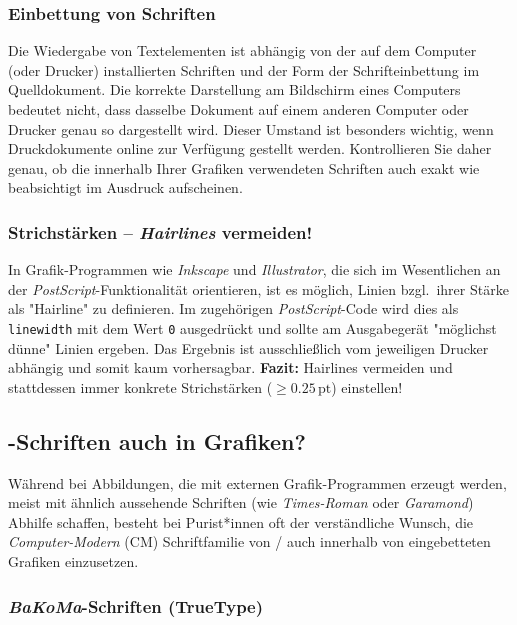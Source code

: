 \subsubsection{Einbettung von Schriften}

Die Wiedergabe von Textelementen ist abhängig von der auf dem Computer (oder
Drucker) installierten Schriften und der Form der Schrifteinbettung im
Quelldokument. Die korrekte Darstellung am Bildschirm eines Computers
bedeutet nicht, dass dasselbe Dokument auf einem anderen Computer oder
Drucker genau so dargestellt wird. Dieser Umstand ist besonders wichtig, wenn
Druckdokumente online zur Verfügung gestellt werden. Kontrollieren Sie daher
genau, ob die innerhalb Ihrer Grafiken verwendeten Schriften auch exakt wie
beabsichtigt im Ausdruck aufscheinen.


\subsubsection{Strichstärken -- \emph{Hairlines} vermeiden!}

In Grafik-Programmen wie \emph{Inkscape} und \emph{Illustrator}, die sich im
Wesentlichen an der \emph{PostScript}-Funktionalität orientieren, ist es
möglich, Linien bzgl.\ ihrer Stärke als "Hairline" zu definieren. Im
zugehörigen \emph{PostScript}-Code wird dies als \texttt{linewidth} mit dem
Wert \texttt{0} ausgedrückt und sollte am Ausgabegerät "möglichst dünne"
Linien ergeben. Das Ergebnis ist ausschließlich vom jeweiligen Drucker
abhängig und somit kaum vorhersagbar.
\textbf{Fazit:} Hairlines vermeiden und stattdessen immer konkrete
Strichstärken ($\geq 0.25\,\mathrm{pt}$) einstellen!


\subsection{\tex-Schriften auch in Grafiken?}
\label{sec:tex-schriften-in-grafiken}

Während bei Abbildungen, die mit externen Grafik-Programmen erzeugt werden,
meist mit ähnlich aussehende Schriften (wie \emph{Times-Roman} oder
\emph{Garamond}) Abhilfe schaffen, besteht bei Purist*innen oft der
verständliche Wunsch, die \emph{Computer-Modern} (CM) Schriftfamilie von
{\tex}/{\latex} auch innerhalb von eingebetteten Grafiken einzusetzen.

\subsubsection{\emph{BaKoMa}-Schriften (TrueType)}

